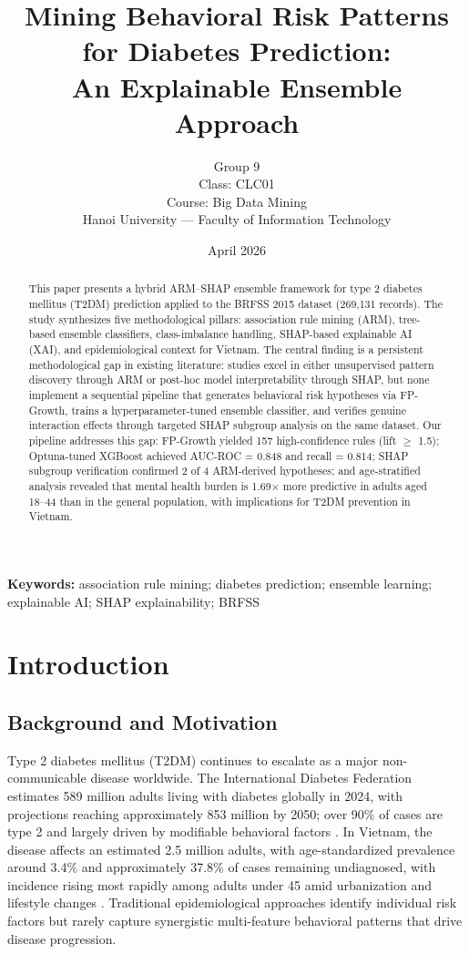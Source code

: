 ﻿\documentclass[12pt,a4paper]{article}
\title{\textbf{Mining Behavioral Risk Patterns for Diabetes Prediction:\\An Explainable Ensemble Approach}}
\author{
    Group 9\\
    \small Class: CLC01\\
    \small Course: Big Data Mining\\
    \small Hanoi University --- Faculty of Information Technology
}
\date{April 2026}
\begin{document}
\maketitle
\tableofcontents
\newpage

\begin{abstract}
This paper presents a hybrid ARM--SHAP ensemble framework for type 2 diabetes mellitus
(T2DM) prediction applied to the BRFSS 2015 dataset (269,131 records). The study
synthesizes five methodological pillars: association rule mining (ARM), tree-based ensemble
classifiers, class-imbalance handling, SHAP-based explainable AI (XAI), and epidemiological
context for Vietnam. The central finding is a persistent methodological gap in existing
literature: studies excel in either unsupervised pattern discovery through ARM or post-hoc
model interpretability through SHAP, but none implement a sequential pipeline that generates
behavioral risk hypotheses via FP-Growth, trains a hyperparameter-tuned ensemble classifier,
and verifies genuine interaction effects through targeted SHAP subgroup analysis on the same
dataset. Our pipeline addresses this gap: FP-Growth yielded 157 high-confidence rules
(lift $\geq$ 1.5); Optuna-tuned XGBoost achieved AUC-ROC = 0.848 and recall = 0.814;
SHAP subgroup verification confirmed 2 of 4 ARM-derived hypotheses; and age-stratified
analysis revealed that mental health burden is 1.69$\times$ more predictive in adults aged
18--44 than in the general population, with implications for T2DM prevention in Vietnam.
\end{abstract}

\textbf{Keywords:} association rule mining; diabetes prediction; ensemble learning;
explainable AI; SHAP explainability; BRFSS

\section{Introduction}

\subsection{Background and Motivation}

Type 2 diabetes mellitus (T2DM) continues to escalate as a major non-communicable disease
worldwide. The International Diabetes Federation estimates 589 million adults living with
diabetes globally in 2024, with projections reaching approximately 853 million by 2050;
over 90\% of cases are type 2 and largely driven by modifiable behavioral factors
\citep{Duncan2025}. In Vietnam, the disease affects an estimated 2.5 million adults,
with age-standardized prevalence around 3.4\% and approximately 37.8\% of cases remaining
undiagnosed, with incidence rising most rapidly among adults under 45 amid urbanization
and lifestyle changes \citep{Vuong2024, Nguyen2015}. Traditional epidemiological approaches
identify individual risk factors but rarely capture synergistic multi-feature behavioral
patterns that drive disease progression.
\end{document}
